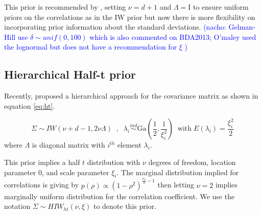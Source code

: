 \documentclass[12pt]{article}
\newcommand{\nacho}[1]{\textcolor{blue}{(nacho: #1)}}
\newcommand{\I}{\mathrm{I}}
\begin{document}

This prior is recommended by \cite{gelmanhill}, setting $\nu=d+1$ and $\Lambda=\I$ to ensure uniform priors on the correlations as in the IW prior but now there is more flexibility on incorporating prior information about the standard deviations. \nacho{ Gelman-Hill use $\delta \sim unif(0,100)$ which is also commented on BDA2013; O'maley used the lognormal but does not have a recommendation for $\xi$ }

\subsection{Hierarchical Half-t prior}

Recently, \cite{huang2013simple} proposed a hierarchical approach for the covariance matrix as shown in equation \eqref{eq:ht}. 

\begin{equation}
\Sigma \sim IW( \nu + d - 1 ,  2\nu\Lambda) \;\;,\;\;  \lambda_i  \stackrel{ind} \sim \mbox{Ga}\left(\frac{1}{2} , \frac{1}{\xi_i^2}\right) \;\; \mbox{with} \; E(\lambda_i)=\frac{\xi_i^2}{2} 
\label{eq:ht}
\end{equation} 
where $\Lambda$ is diagonal matrix with $i^{th}$ element $\lambda_i$. 

This prior implies a half $t$ distribution with $\nu$ degrees of freedom, location parameter 0, and scale parameter $\xi_i$.  The marginal distribution implied for correlations is giving by $p(\rho) \propto (1-\rho^2)^{\frac{\nu_0}{2}-1}$ then letting $\nu=2$ implies marginally uniform distribution for the correlation coefficient. We use the notation $\Sigma \sim HIW_{ht}(\nu, \xi)$ to denote this prior.
\end{document}
